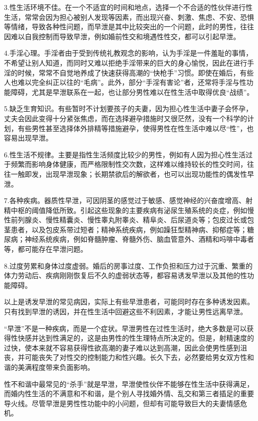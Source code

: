 \documentclass[12pt,UTF8]{ctexbook}
\begin{document}
3.性生活环境不佳。在一个不适宜的时间和地点，选择一个不合适的性伙伴进行性生活，常常会因为担心被别人发现等因素，而出现兴奋、刺激、焦虑、不安、恐惧等情绪，导致各种性问题，而早泄是其中比较突出的一个问题，此时的男性，往往因难以自我控制而导致早泄，例如婚前性交和境遇性性交，都可以引起早泄。

4.手淫心理。手淫者由于受到传统礼教观念的影响，认为手淫是一件羞耻的事情，不希望让别人知道，而同时又难以拒绝手淫带来的巨大的身心愉悦，因此在进行手淫的时候，常常不自觉地养成了快速获得高潮的“快枪手”习惯。即使在婚后，有些人也难以完全纠正以往的“毛病”。此外，部分“手淫有害论”者，还常将手淫与性功能障碍，尤其是早泄联系在一起，也让部分男性难以在性生活中取得优良“战绩”。

5.缺乏生育知识。有些暂时不计划要孩子的夫妻，因为担心性生活中妻子会怀孕，丈夫会因此变得十分紧张焦虑，而在选择避孕措施时又很茫然，没有一个科学的计划，有些男性甚至选择体外排精等措施避孕，使得男性在性生活中难以尽“性”，也容易出现早泄。

6.性生活不规律。主要是指性生活频度比较少的男性，例如有人因为担心性生活过于频繁而影响身体健康，而严格限制性交次数，这样难以维持较长的性交时间，往往一触即发，出现早泄现象；长期禁欲后的解欲者，也可以出现功能性的偶发性早泄。

7.各种疾病。器质性早泄，可因阴茎的感觉过于敏感、感觉神经的兴奋度增高、射精中枢的阈值降低所致。引起这些现象的主要疾病有泌尿生殖系统的炎症，例如慢性前列腺炎、慢性精囊炎、慢性睾丸附睾炎、精阜炎、后尿道炎等；包皮过长或包茎患者，以及包皮系带过短者；精神系统疾病，例如躁狂型精神病、抑郁症等；糖尿病；神经系统疾病，例如脊髓肿瘤、脊髓外伤、脑血管意外、酒精和吗啡中毒者等，都可能存在早泄问题。

8.过度劳累和身体过度虚弱。婚后的房事过度、工作负担和压力过于沉重、繁重的体力劳动后、疾病刚刚恢复后不久的虚弱状态等，都容易诱发早泄以及其他的性功能障碍。

以上是诱发早泄的常见病因，实际上有些早泄患者，可能同时存在多种诱发因素。只有找到早泄的诱因，并在性生活中回避这些不利因素，才能让男性远离早泄。

“早泄”不是一种疾病，而是一个症状。早泄男性在过性生活时，绝大多数是可以获得性快感并达到性满足的，这是由男性的性生理特点所决定的。但是，射精速度的过快，使本来就不容易获得性欲高潮的妻子难以达到高潮，因此会使男性感到沮丧，并可能丧失了对性交的控制能力和性兴趣。长久下去，必然要给男女双方性和谐的美满程度带来负面影响。

性不和谐中最常见的“杀手”就是早泄，早泄使性伙伴不能够在性生活中获得满足，而婚内性生活的不满意和不和谐，是个别人寻找婚外情、乱交和第三者插足的重要导火线。尽管早泄是男性性功能中的小问题，但却有可能导致巨大的夫妻情感危机。
\end{document}
